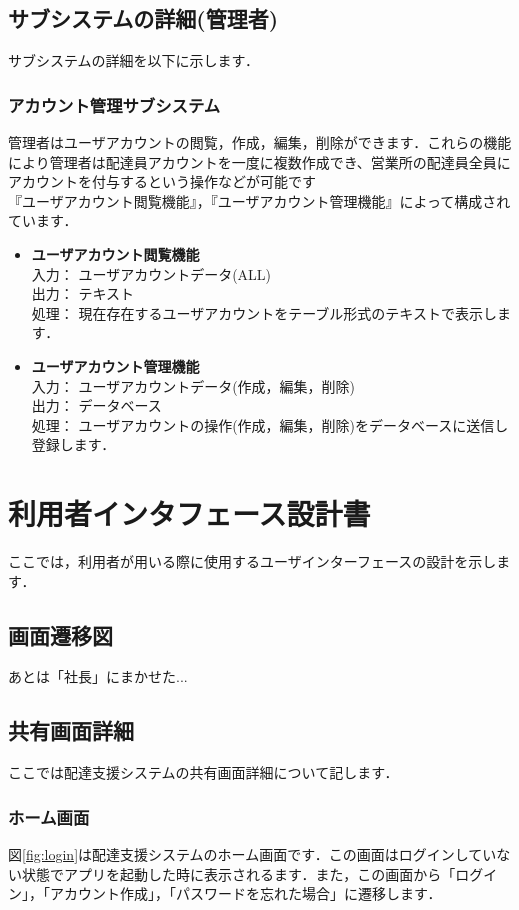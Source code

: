 \documentclass[a4j,titlepage]{jarticle}
\begin{document}
\subsection{サブシステムの詳細(管理者)}
サブシステムの詳細を以下に示します．

\subsubsection{アカウント管理サブシステム}
管理者はユーザアカウントの閲覧，作成，編集，削除ができます．これらの機能により管理者は配達員アカウントを一度に複数作成でき、営業所の配達員全員にアカウントを付与するという操作などが可能です\\
『ユーザアカウント閲覧機能』，『ユーザアカウント管理機能』によって構成されています．
\begin{itemize}
\item \textbf{ユーザアカウント閲覧機能} \\
入力： ユーザアカウントデータ(ALL) \\
出力： テキスト \\
処理： 現在存在するユーザアカウントをテーブル形式のテキストで表示します．
\item \textbf{ユーザアカウント管理機能} \\
入力： ユーザアカウントデータ(作成，編集，削除) \\
出力： データベース \\
処理： ユーザアカウントの操作(作成，編集，削除)をデータベースに送信し登録します．
\end{itemize}

\newpage

\section{利用者インタフェース設計書}
ここでは，利用者が用いる際に使用するユーザインターフェースの設計を示します．

\subsection{画面遷移図}
あとは「社長」にまかせた...

\subsection{共有画面詳細}
ここでは配達支援システムの共有画面詳細について記します．

\subsubsection{ホーム画面}
図\ref{fig:login}は配達支援システムのホーム画面です．この画面はログインしていない状態でアプリを起動した時に表示されるます．また，この画面から「ログイン」，「アカウント作成」，「パスワードを忘れた場合」に遷移します．
\end{document}
